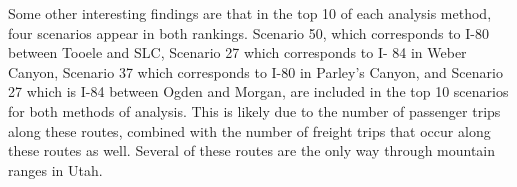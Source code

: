 Some other interesting findings are that in the top 10 of each analysis
method, four scenarios appear in both rankings. Scenario 50, which
corresponds to I-80 between Tooele and SLC, Scenario 27 which corresponds to I-
84 in Weber Canyon, Scenario 37 which corresponds to I-80 in Parley’s Canyon,
and Scenario 27 which is I-84 between Ogden and Morgan, are included in the
top 10 scenarios for both methods of analysis. This is likely due to the
number of passenger trips along these routes, combined with the number of freight
trips that occur along these routes as well. Several of these routes are
the only way through mountain ranges in Utah.

\begin{table}

\begin{table}


\end{table}
\end{table}
